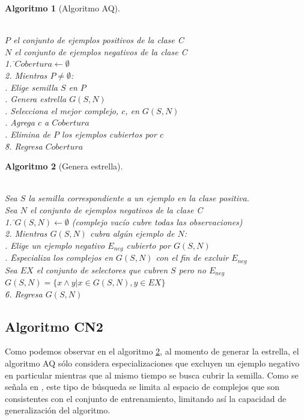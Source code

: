 \documentclass[12pt]{scrbook}
\theoremstyle{break}
\theoremstyle{break}
\newtheorem{algoritmo}{Algoritmo}[chapter]
\begin{document}
\begin{algoritmo}[Algoritmo AQ]
\begin{tabbing}
\\$P$ el conjunto de ejemplos positivos de la clase C
\\$N$ el conjunto de ejemplos negativos de la clase C\\
1. \=$Cobertura\leftarrow \emptyset $ \\
2. Mientras $P \neq \emptyset$:\\
 . Elige semilla $S$ en $P$\\
 . Genera estrella $G(S,N)$\\
 . Selecciona el mejor complejo, $c$, en $G(S,N)$\\
 . Agrega $c$ a $Cobertura$\\
 . Elimina de $P$ los ejemplos cubiertos por $c$\\
\=8. Regresa $Cobertura$
\end{tabbing}
\label{algo:AQ}
\end{algoritmo}

\begin{algoritmo}[Genera estrella]
\begin{tabbing}
\\Sea $S$ la semilla correspondiente a un ejemplo en la clase positiva.
\\Sea $N$ el conjunto de ejemplos negativos de la clase C\\
1. \=$G(S,N)\leftarrow \emptyset$ (complejo vacío cubre todas las observaciones) \\
2. Mientras $G(S,N)$ cubra algún ejemplo de $N$:\\
 . Elige un ejemplo negativo $E_{neg}$ cubierto por $G(S,N)$\\
 . \= Especializa los complejos en $G(S,N)$ con el fin de excluir $E_{neg}$\\
 \> Sea $EX$ el conjunto de selectores que cubren $S$ pero no $E_{neg}$ \\
 \> $G(S,N)=\{x \wedge y \vert x \in G(S,N), y \in EX \}$\\
\=6. Regresa $G(S,N)$
\end{tabbing}
\label{algo:AQ genera estrella}
\end{algoritmo}

\subsection{Algoritmo CN2}
\label{subseccion:algoritmo cn2}
Como podemos observar en el algoritmo \ref{algo:AQ genera estrella}, al momento de generar la estrella, el algoritmo AQ sólo considera especializaciones que excluyen un ejemplo negativo en particular mientras que al mismo tiempo se busca cubrir la semilla. Como se señala en \cite{CN2-Clark1989}, este tipo de búsqueda se limita al espacio de complejos que son consistentes con el conjunto de entrenamiento, limitando así la capacidad de generalización del algoritmo.
\end{document}
